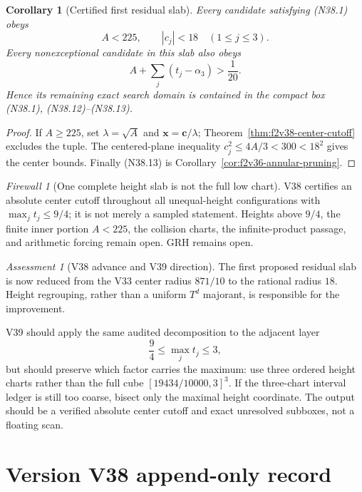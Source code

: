 \documentclass[11pt]{article}
\newtheorem{corollary}[theorem]{Corollary}
\theoremstyle{definition}
\theoremstyle{remark}
\newtheorem{assessment}[theorem]{Assessment}
\newtheorem{firewall}[theorem]{Firewall}
\begin{document}
\begin{corollary}[Certified first residual slab]
\label{cor:f2v38-first-slab}
Every candidate satisfying \textup{(N38.1)} obeys
\[
 \boxed{A<225,\qquad |c_j|<18\quad(1\leq j\leq3).}
\tag{N38.12}
\]
Every nonexceptional candidate in this slab also obeys
\[
 A+\sum_j(t_j-\alpha_3)>\frac1{20}.
\tag{N38.13}
\]
Hence its remaining exact search domain is contained in the compact box
\textup{(N38.1)}, \textup{(N38.12)}--\textup{(N38.13)}.
\end{corollary}

\begin{proof}
If \(A\geq225\), set \(\lambda=\sqrt A\) and
\(\bm x=\bm c/\lambda\); Theorem~\ref{thm:f2v38-center-cutoff} excludes
the tuple.  The centered-plane inequality
\(c_j^2\leq4A/3<300<18^2\) gives the center bounds.  Finally
\textup{(N38.13)} is Corollary~\ref{cor:f2v36-annular-pruning}.
\end{proof}

\begin{firewall}[One complete height slab is not the full low chart]
\label{fire:f2v38}
V38 certifies an absolute center cutoff throughout all unequal-height
configurations with \(\max_jt_j\leq9/4\); it is not merely a sampled
statement.  Heights above \(9/4\), the finite inner portion \(A<225\),
the collision charts, the infinite-product passage, and arithmetic forcing
remain open.  GRH remains open.
\end{firewall}

\begin{assessment}[V38 advance and V39 direction]
\label{ass:f2v38}
The first proposed residual slab is now reduced from the V33 center radius
\(871/10\) to the rational radius \(18\).  Height regrouping, rather than
a uniform \(T^d\) majorant, is responsible for the improvement.

V39 should apply the same audited decomposition to the adjacent layer
\[
 \frac94\leq\max_jt_j\leq3,
\tag{N38.14}
\]
but should preserve which factor carries the maximum: use three ordered
height charts rather than the full cube \([19434/10000,3]^3\).  If the
three-chart interval ledger is still too coarse, bisect only the maximal
height coordinate.  The output should be a verified absolute center cutoff
and exact unresolved subboxes, not a floating scan.
\end{assessment}

\section*{Version V38 append-only record}
\end{document}
